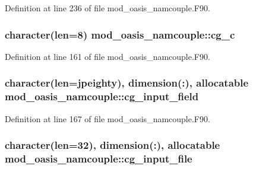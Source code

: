 Definition at line 236 of file mod\+\_\+oasis\+\_\+namcouple.\+F90.

\hypertarget{classmod__oasis__namcouple_a8a7387f27c409ea27aa53b616805f0fa}{
\subsubsection[{cg\+\_\+c}]{\setlength{\rightskip}{0pt plus 5cm}character(len=8) mod\+\_\+oasis\+\_\+namcouple\+::cg\+\_\+c\hspace{0.3cm}{\ttfamily [private]}}}\label{classmod__oasis__namcouple_a8a7387f27c409ea27aa53b616805f0fa}


Definition at line 161 of file mod\+\_\+oasis\+\_\+namcouple.\+F90.

\hypertarget{classmod__oasis__namcouple_aad4d4857b4c424e1b0f0bcc0a01aa6e3}{
\subsubsection[{cg\+\_\+input\+\_\+field}]{\setlength{\rightskip}{0pt plus 5cm}character(len={\bf jpeighty}), dimension(\+:), allocatable mod\+\_\+oasis\+\_\+namcouple\+::cg\+\_\+input\+\_\+field\hspace{0.3cm}{\ttfamily [private]}}}\label{classmod__oasis__namcouple_aad4d4857b4c424e1b0f0bcc0a01aa6e3}


Definition at line 167 of file mod\+\_\+oasis\+\_\+namcouple.\+F90.

\hypertarget{classmod__oasis__namcouple_a24f56cf88d79190f229d3fd1d62d17de}{
\subsubsection[{cg\+\_\+input\+\_\+file}]{\setlength{\rightskip}{0pt plus 5cm}character(len=32), dimension(\+:), allocatable mod\+\_\+oasis\+\_\+namcouple\+::cg\+\_\+input\+\_\+file\hspace{0.3cm}{\ttfamily [private]}}}\label{classmod__oasis__namcouple_a24f56cf88d79190f229d3fd1d62d17de}


